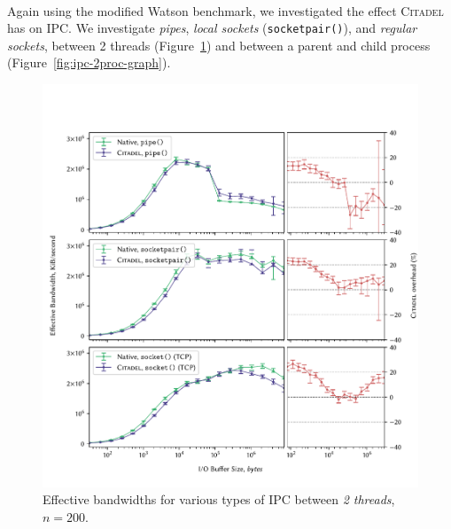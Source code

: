 \paragraph{} Again using the modified Watson benchmark, we investigated the effect \textsc{Citadel} has on IPC. We investigate \textit{pipes}, \textit{local sockets} (\texttt{socketpair()}), and \textit{regular sockets}, between 2 threads (Figure~\ref{fig:ipc-2thread-graph}) and between a parent and child process (Figure~\ref{fig:ipc-2proc-graph}).

\begin{figure}[]
    \centering
    \includegraphics[width=\linewidth]{figures/graphs/ipc-2thread.pdf}
    \vspace{-5mm}
    \caption{Effective bandwidths for various types of IPC between \textit{2 threads}, $n=200$.}
    \label{fig:ipc-2thread-graph}
\end{figure}


